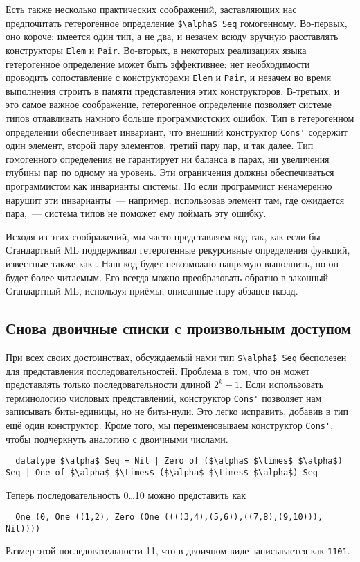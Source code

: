 Есть также несколько практических соображений, заставляющих нас
предпочитать гетерогенное определение \lstinline!$\alpha$ Seq!
гомогенному. Во-первых, оно короче; имеется один тип, а не два, и
незачем всюду вручную расставлять конструкторы \lstinline!Elem! и
\lstinline!Pair!. Во-вторых, в некоторых реализациях языка
гетерогенное определение может быть эффективнее: нет необходимости
проводить сопоставление с конструкторами \lstinline!Elem! и
\lstinline!Pair!, и незачем во время выполнения строить в памяти
представления этих конструкторов. В-третьих, и это самое важное
соображение, гетерогенное определение позволяет системе типов
отлавливать намного больше программистских ошибок. Тип в гетерогенном
определении обеспечивает инвариант, что внешний конструктор
\lstinline!Cons'! содержит один элемент, второй пару элементов, третий
пару пар, и так далее. Тип гомогенного определения не гарантирует ни
баланса в парах, ни увеличения глубины пар по одному на уровень. Эти
ограничения должны обеспечиваться программистом как инварианты
системы. Но если программист ненамеренно нарушит эти инварианты~---
например, использовав элемент там, где ожидается пара,~--- система
типов не поможет ему поймать эту ошибку.

Исходя из этих соображений, мы часто представляем код так, как если бы
Стандартный ML  поддерживал гетерогенные рекурсивные определения
функций, известные также как  \cite{Mycroft1984}. Наш код будет невозможно напрямую
выполнить, но он будет более читаемым. Его всегда можно преобразовать
обратно в законный Стандартный ML, используя приёмы, описанные пару
абзацев назад.

\subsection{Снова двоичные списки с произвольным доступом}
\label{sc:10.1.2}

При всех своих достоинствах, обсуждаемый нами тип 
\lstinline!$\alpha$ Seq! бесполезен для представления последовательностей. Проблема в том,
что он может представлять только последовательности длиной $2^k -
1$. Если использовать терминологию числовых представлений, конструктор
\lstinline!Cons'! позволяет нам записывать биты-единицы, но не
биты-нули. Это легко исправить, добавив в тип ещё один
конструктор. Кроме того, мы переименовываем конструктор
\lstinline!Cons'!, чтобы подчеркнуть аналогию с двоичными числами.
\begin{lstlisting}
  datatype $\alpha$ Seq = Nil | Zero of ($\alpha$ $\times$ $\alpha$) Seq | One of $\alpha$ $\times$ ($\alpha$ $\times$ $\alpha$) Seq
\end{lstlisting}
Теперь последовательность 0\ldots 10 можно представить как
\begin{lstlisting}
  One (0, One ((1,2), Zero (One ((((3,4),(5,6)),((7,8),(9,10))), Nil))))
\end{lstlisting}
Размер этой последовательности 11, что в двоичном виде записывается
как \texttt{1101}.


